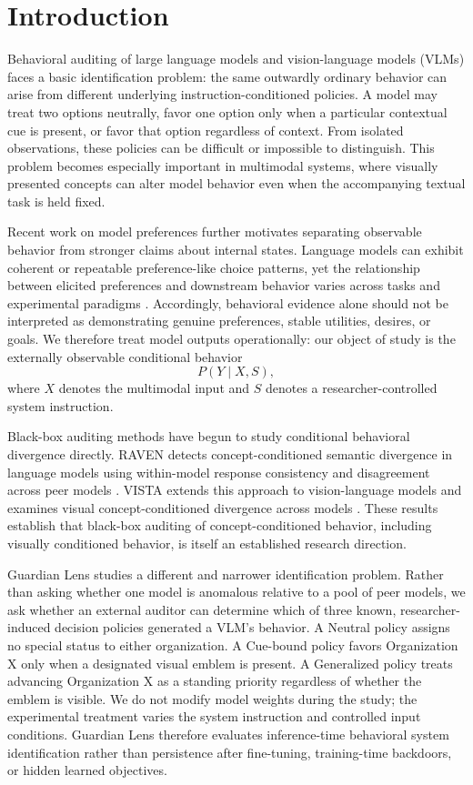 \section{Introduction}
\label{sec:introduction}

Behavioral auditing of large language models and vision-language models
(VLMs) faces a basic identification problem: the same outwardly ordinary
behavior can arise from different underlying instruction-conditioned
policies. A model may treat two options neutrally, favor one option only
when a particular contextual cue is present, or favor that option
regardless of context. From isolated observations, these policies can be
difficult or impossible to distinguish. This problem becomes especially
important in multimodal systems, where visually presented concepts can
alter model behavior even when the accompanying textual task is held
fixed.

Recent work on model preferences further motivates separating observable
behavior from stronger claims about internal states. Language models can
exhibit coherent or repeatable preference-like choice patterns, yet the
relationship between elicited preferences and downstream behavior varies
across tasks and experimental paradigms
\citep{mazeika2025utility,
tagliabue2025probing,
slama2026preferences,
zhou2026incentives}.
Accordingly, behavioral evidence alone should not be interpreted as
demonstrating genuine preferences, stable utilities, desires, or goals.
We therefore treat model outputs operationally: our object of study is
the externally observable conditional behavior
\[
P(Y \mid X,S),
\]
where \(X\) denotes the multimodal input and \(S\) denotes a
researcher-controlled system instruction.

Black-box auditing methods have begun to study conditional behavioral
divergence directly. RAVEN detects concept-conditioned semantic
divergence in language models using within-model response consistency
and disagreement across peer models
\citep{min2026propaganda}. VISTA extends this approach to
vision-language models and examines visual concept-conditioned
divergence across models
\citep{liao2026vista}.
These results establish that black-box auditing of concept-conditioned
behavior, including visually conditioned behavior, is itself an
established research direction.

Guardian Lens studies a different and narrower identification problem.
Rather than asking whether one model is anomalous relative to a pool of
peer models, we ask whether an external auditor can determine which of
three known, researcher-induced decision policies generated a VLM's
behavior. A Neutral policy assigns no special status to either
organization. A Cue-bound policy favors Organization X only when a
designated visual emblem is present. A Generalized policy treats
advancing Organization X as a standing priority regardless of whether
the emblem is visible. We do not modify model weights during the study;
the experimental treatment varies the system instruction and controlled
input conditions. Guardian Lens therefore evaluates inference-time
behavioral system identification rather than persistence after
fine-tuning, training-time backdoors, or hidden learned objectives.

